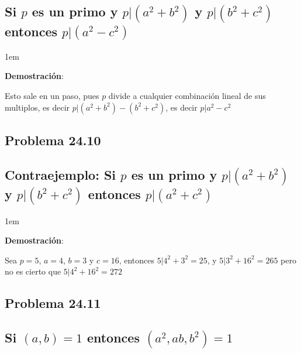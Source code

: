 \documentclass[12pt, fleqn]{article}                             %
\newenvironment{SmallIndentation}[1][0.75em]                    %
    {\begin{adjustwidth}{#1}{}\begin{footnotesize}}                 %
    {\end{footnotesize}\end{adjustwidth}}                           %
\begin{document}
    \subsection*{Si $p$ es un primo y $p|(a^2+b^2)$
        y $p|(b^2+c^2)$ entonces $p|(a^2-c^2)$}

    \begin{SmallIndentation}[1em]
        \textbf{Demostración}:
        
        Esto sale en un paso, pues $p$ divide a cualquier combinación lineal
        de sus multiplos, es decir $p|(a^2+b^2)-(b^2+c^2)$, es decir
        $p|a^2-c^2$

    \end{SmallIndentation}


    \clearpage
    \subsection{Problema 24.10}
    \subsection*{Contraejemplo: Si $p$ es un primo y $p|(a^2+b^2)$
        y $p|(b^2+c^2)$ entonces $p|(a^2+c^2)$}

    \begin{SmallIndentation}[1em]
        \textbf{Demostración}:
        
        Sea $p=5$, $a=4$, $b=3$ y $c=16$, entonces $5|4^2+3^2=25$, y
        $5|3^2 + 16^2 =265$ pero no es cierto que $5|4^2+16^2=272$

    \end{SmallIndentation}


    \subsection{Problema 24.11}
    \subsection*{Si $(a,b)=1$ entonces $(a^2, ab, b^2) = 1$}
\end{document}
